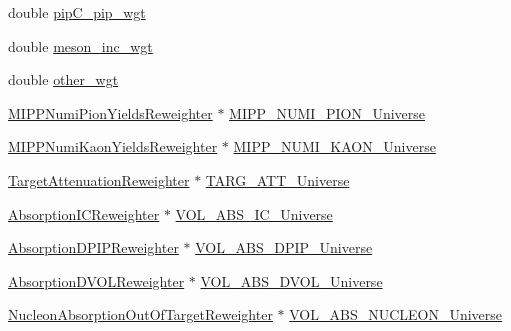 \begin{DoxyCompactItemize}
\item 
double \hyperlink{class_neutrino_flux_reweight_1_1_reweight_driver_a61de96d5fb96639323a271dcf0677be0}{pip\-C\-\_\-pip\-\_\-wgt}
\item 
double \hyperlink{class_neutrino_flux_reweight_1_1_reweight_driver_a3b30ffd833e048ca64026eac4e26e054}{meson\-\_\-inc\-\_\-wgt}
\item 
double \hyperlink{class_neutrino_flux_reweight_1_1_reweight_driver_a091fc9bedb46c494e5ffd19b2cb55cc5}{other\-\_\-wgt}
\item 
\hyperlink{class_neutrino_flux_reweight_1_1_m_i_p_p_numi_pion_yields_reweighter}{M\-I\-P\-P\-Numi\-Pion\-Yields\-Reweighter} $\ast$ \hyperlink{class_neutrino_flux_reweight_1_1_reweight_driver_adc0be38614dfed8be560f60dda603d71}{M\-I\-P\-P\-\_\-\-N\-U\-M\-I\-\_\-\-P\-I\-O\-N\-\_\-\-Universe}
\item 
\hyperlink{class_neutrino_flux_reweight_1_1_m_i_p_p_numi_kaon_yields_reweighter}{M\-I\-P\-P\-Numi\-Kaon\-Yields\-Reweighter} $\ast$ \hyperlink{class_neutrino_flux_reweight_1_1_reweight_driver_a58a8d80767fec9b87d60c1b548571d8b}{M\-I\-P\-P\-\_\-\-N\-U\-M\-I\-\_\-\-K\-A\-O\-N\-\_\-\-Universe}
\item 
\hyperlink{class_neutrino_flux_reweight_1_1_target_attenuation_reweighter}{Target\-Attenuation\-Reweighter} $\ast$ \hyperlink{class_neutrino_flux_reweight_1_1_reweight_driver_a7f2dbff7048f621b5d9ca403e86f864b}{T\-A\-R\-G\-\_\-\-A\-T\-T\-\_\-\-Universe}
\item 
\hyperlink{class_neutrino_flux_reweight_1_1_absorption_i_c_reweighter}{Absorption\-I\-C\-Reweighter} $\ast$ \hyperlink{class_neutrino_flux_reweight_1_1_reweight_driver_abb5089345876df70f39277583fd5b630}{V\-O\-L\-\_\-\-A\-B\-S\-\_\-\-I\-C\-\_\-\-Universe}
\item 
\hyperlink{class_neutrino_flux_reweight_1_1_absorption_d_p_i_p_reweighter}{Absorption\-D\-P\-I\-P\-Reweighter} $\ast$ \hyperlink{class_neutrino_flux_reweight_1_1_reweight_driver_aabc34b031559da21fc8353f88fac9573}{V\-O\-L\-\_\-\-A\-B\-S\-\_\-\-D\-P\-I\-P\-\_\-\-Universe}
\item 
\hyperlink{class_neutrino_flux_reweight_1_1_absorption_d_v_o_l_reweighter}{Absorption\-D\-V\-O\-L\-Reweighter} $\ast$ \hyperlink{class_neutrino_flux_reweight_1_1_reweight_driver_acff29f50e90c0f4b4601bc1a1d503d8e}{V\-O\-L\-\_\-\-A\-B\-S\-\_\-\-D\-V\-O\-L\-\_\-\-Universe}
\item 
\hyperlink{class_neutrino_flux_reweight_1_1_nucleon_absorption_out_of_target_reweighter}{Nucleon\-Absorption\-Out\-Of\-Target\-Reweighter} $\ast$ \hyperlink{class_neutrino_flux_reweight_1_1_reweight_driver_a3d4919b06407f2513ea43368e08799cc}{V\-O\-L\-\_\-\-A\-B\-S\-\_\-\-N\-U\-C\-L\-E\-O\-N\-\_\-\-Universe}

\end{DoxyCompactItemize}
